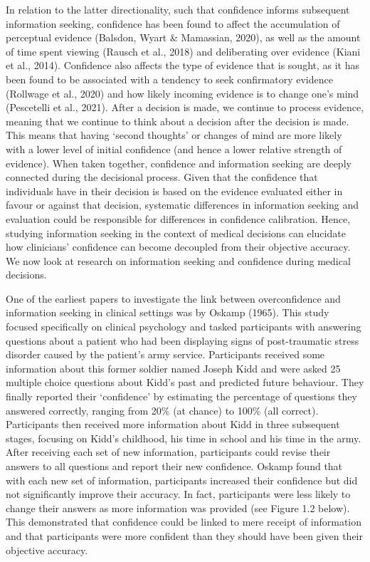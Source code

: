 \documentclass[a4paper, nobind]{templates/ociamthesis}
\begin{document}
\hfill\break
In relation to the latter directionality, such that confidence informs subsequent information seeking, confidence has been found to affect the accumulation of perceptual evidence (Balsdon, Wyart \& Mamassian, 2020), as well as the amount of time spent viewing (Rausch et al., 2018) and deliberating over evidence (Kiani et al., 2014). Confidence also affects the type of evidence that is sought, as it has been found to be associated with a tendency to seek confirmatory evidence (Rollwage et al., 2020) and how likely incoming evidence is to change one's mind (Pescetelli et al., 2021). After a decision is made, we continue to process evidence, meaning that we continue to think about a decision after the decision is made. This means that having `second thoughts' or changes of mind are more likely with a lower level of initial confidence (and hence a lower relative strength of evidence). When taken together, confidence and information seeking are deeply connected during the decisional process. Given that the confidence that individuals have in their decision is based on the evidence evaluated either in favour or against that decision, systematic differences in information seeking and evaluation could be responsible for differences in confidence calibration. Hence, studying information seeking in the context of medical decisions can elucidate how clinicians' confidence can become decoupled from their objective accuracy. We now look at research on information seeking and confidence during medical decisions.

\hfill\break
One of the earliest papers to investigate the link between overconfidence and information seeking in clinical settings was by Oskamp (1965). This study focused specifically on clinical psychology and tasked participants with answering questions about a patient who had been displaying signs of post-traumatic stress disorder caused by the patient's army service. Participants received some information about this former soldier named Joseph Kidd and were asked 25 multiple choice questions about Kidd's past and predicted future behaviour. They finally reported their `confidence' by estimating the percentage of questions they answered correctly, ranging from 20\% (at chance) to 100\% (all correct). Participants then received more information about Kidd in three subsequent stages, focusing on Kidd's childhood, his time in school and his time in the army. After receiving each set of new information, participants could revise their answers to all questions and report their new confidence. Oskamp found that with each new set of information, participants increased their confidence but did not significantly improve their accuracy. In fact, participants were less likely to change their answers as more information was provided (see Figure 1.2 below). This demonstrated that confidence could be linked to mere receipt of information and that participants were more confident than they should have been given their objective accuracy.
\end{document}
